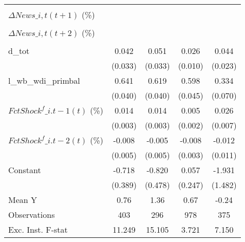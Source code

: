 {\begin{tabular}{l*{4}{c}}
                    &                     &                     &                     &                     \\
\addlinespace
$ \Delta News\_{i,t}(t+1)$ (\%)&                     &                     &                     &                     \\
                    &                     &                     &                     &                     \\
\addlinespace
$ \Delta News\_{i,t}(t+2)$ (\%)&                     &                     &                     &                     \\
                    &                     &                     &                     &                     \\
\addlinespace
d\_tot               &       0.042         &       0.051         &       0.026\sym{***}&       0.044\sym{*}  \\
                    &     (0.033)         &     (0.033)         &     (0.010)         &     (0.023)         \\
\addlinespace
l\_wb\_wdi\_primbal    &       0.641\sym{***}&       0.619\sym{***}&       0.598\sym{***}&       0.334\sym{***}\\
                    &     (0.040)         &     (0.040)         &     (0.045)         &     (0.070)         \\
\addlinespace
$ FctShock^f\_{i.t-1}(t)$ (\%)&       0.014\sym{***}&       0.014\sym{***}&       0.005\sym{**} &       0.026\sym{***}\\
                    &     (0.003)         &     (0.003)         &     (0.002)         &     (0.007)         \\
\addlinespace
$ FctShock^f\_{i.t-2}(t)$ (\%)&      -0.008         &      -0.005         &      -0.008\sym{**} &      -0.012         \\
                    &     (0.005)         &     (0.005)         &     (0.003)         &     (0.011)         \\
\addlinespace
Constant            &      -0.718\sym{*}  &      -0.820         &       0.057         &      -1.931         \\
                    &     (0.389)         &     (0.478)         &     (0.247)         &     (1.482)         \\
\midrule
Mean Y              &        0.76         &        1.36         &        0.67         &       -0.24         \\
Observations        &         403         &         296         &         978         &         375         \\
Exc. Inst. F-stat   &      11.249         &      15.105         &       3.721         &       7.150         \\
\bottomrule
\end{tabular}
}
